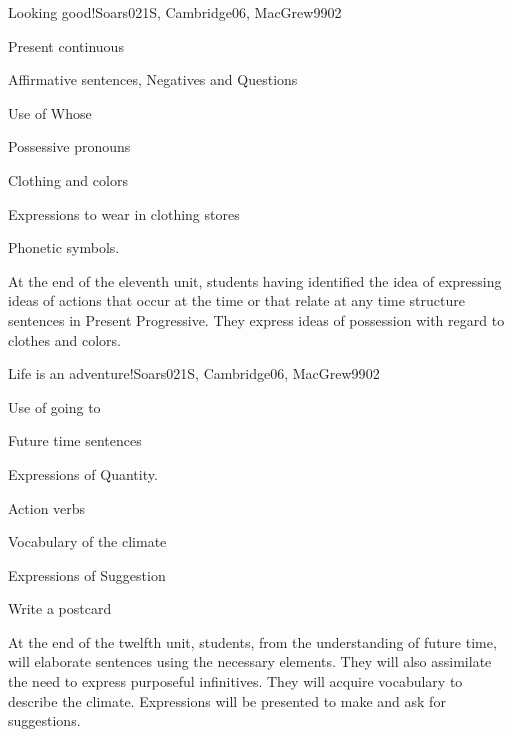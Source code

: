 \begin{syllabus}
\begin{unit}{Looking good!}{}{Soars021S, Cambridge06, MacGrew99}{0}{2}
   \begin{topics}
      \item Present continuous
      \item Affirmative sentences, Negatives and Questions 
      \item Use of Whose
      \item Possessive pronouns
      \item Clothing and colors
      \item Expressions to wear in clothing stores
      \item Phonetic symbols.
   \end{topics}

   \begin{learningoutcomes}
      \item At the end of the eleventh unit, students having identified the idea of expressing ideas of actions that occur at the time or that relate at any time structure sentences in Present Progressive. They express ideas of possession with regard to clothes and colors.
   \end{learningoutcomes}

\end{unit}

\begin{unit}{Life is an adventure!}{}{Soars021S, Cambridge06, MacGrew99}{0}{2}
   \begin{topics}
      \item Use of going to
      \item Future time sentences
      \item Expressions of Quantity.
      \item Action verbs
      \item Vocabulary of the climate
      \item Expressions of Suggestion
      \item Write a postcard
   \end{topics}
   \begin{learningoutcomes}
      \item At the end of the twelfth unit, students, from the understanding of future time, will elaborate sentences using the necessary elements. They will also assimilate the need to express purposeful infinitives. They will acquire vocabulary to describe the climate. Expressions will be presented to make and ask for suggestions.
   \end{learningoutcomes}
\end{unit}


\end{syllabus}
